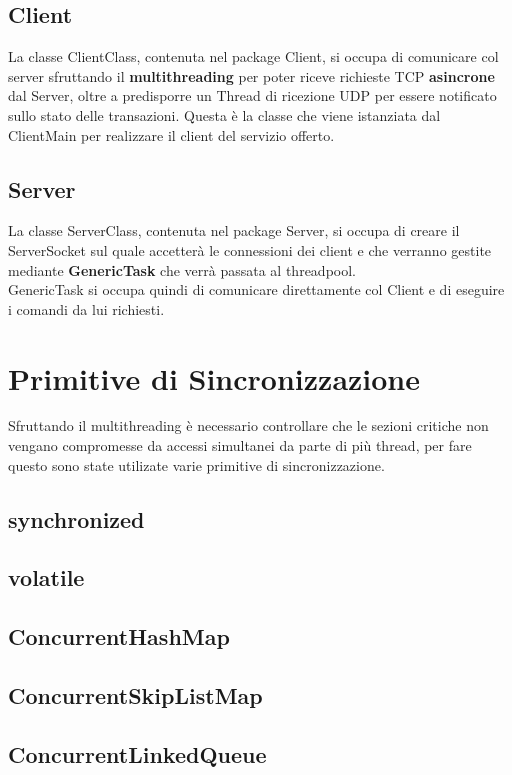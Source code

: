 \documentclass{article}
\begin{document}
\subsection{Client}
La classe ClientClass, contenuta nel package Client, si occupa di comunicare col server sfruttando il \textbf{multithreading} per poter riceve richieste TCP \textbf{asincrone} dal Server, oltre a predisporre un Thread di ricezione UDP per essere notificato sullo stato delle transazioni. 
Questa è la classe che viene istanziata dal ClientMain per realizzare il client del servizio offerto.

\subsection{Server}
La classe ServerClass, contenuta nel package Server, si occupa di creare il ServerSocket sul quale accetterà le connessioni dei client e che verranno gestite mediante \textbf{GenericTask} che verrà passata al threadpool.\\
GenericTask si occupa quindi di comunicare direttamente col Client e di eseguire i comandi da lui richiesti.

\newpage

\section{Primitive di Sincronizzazione}
Sfruttando il multithreading è necessario controllare che le sezioni critiche non vengano compromesse da accessi simultanei da parte di più thread, per fare questo sono state utilizate varie primitive di sincronizzazione.
\subsection{synchronized}

\subsection{volatile}

\subsection{ConcurrentHashMap}

\subsection{ConcurrentSkipListMap}

\subsection{ConcurrentLinkedQueue}
\end{document}
